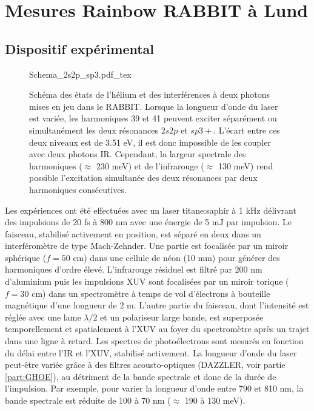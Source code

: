 \section{Mesures Rainbow RABBIT à Lund}
\subsection{Dispositif expérimental}

\begin{figure}
\centering
\def\svgwidth{0.7\textwidth}
{Schema_2s2p_sp3.pdf_tex}
\caption{Schéma des états de l'hélium et des interférences à deux photons mises en jeu dans le RABBIT. Lorsque la longueur d'onde du laser est variée, les harmoniques 39 et 41 peuvent exciter séparément ou simultanément les deux résonances $2s2p$ et $sp3+$. L'écart entre ces deux niveaux est de 3.51 eV, il est donc impossible de les coupler avec deux photons IR. Cependant, la largeur spectrale des harmoniques ($\approx$ 230 meV) et de l'infrarouge ($\approx$ 130 meV) rend possible l'excitation simultanée des deux résonances par deux harmoniques consécutives.} 
\label{fig:Schema_2res}
\end{figure}

Les expériences ont été effectuées avec un laser titane:saphir à 1 kHz délivrant des impulsions de 20 fs à 800 nm avec une énergie de 5 mJ par impulsion. Le faisceau, stabilisé activement en position, est séparé en deux dans un interféromètre de type Mach-Zehnder. Une partie est focalisée par un miroir sphérique ($f = 50$ cm) dans une cellule de néon (10 mm) pour générer des harmoniques d'ordre élevé. L'infrarouge résiduel est filtré par 200 nm d'aluminium puis les impulsions XUV sont focalisées par un miroir torique ($f = 30$ cm) dans un spectromètre à temps de vol d'électrons à bouteille magnétique d'une longueur de 2 m. L'autre partie du faisceau, dont l'intensité est réglée avec une lame $\lambda /2$ et un polariseur large bande, est superposée temporellement et spatialement à l'XUV au foyer du spectromètre après un trajet dans une ligne à retard. Les spectres de photoélectrons sont mesurés en fonction du délai entre l'IR et l'XUV, stabilisé activement. La longueur d'onde du laser peut-être variée grâce à des filtres acousto-optiques (DAZZLER, voir partie \ref{part:GHOE}), au détriment de la bande spectrale et donc de la durée de l'impulsion. Par exemple, pour varier la longueur d'onde entre 790 et 810 nm, la bande spectrale est réduite de 100 à 70 nm ($\approx$ 190 à 130 meV).

